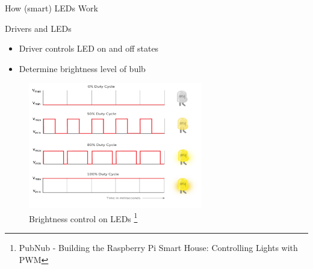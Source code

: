 \documentclass[11pt,t,usepdftitle=false,aspectratio=169]{beamer}
\begin{document}
\begin{frame}{How (smart) LEDs Work}
{        \begin{block}{Drivers and LEDs}
            \begin{itemize}
                \item Driver controls LED on and off states
                \item Determine brightness level of bulb
            \end{itemize}
        \end{block}
    }
     {
        \begin{figure}
            \centering
            \includegraphics[height=5.5cm,keepaspectratio]{img/pwm-duty-cycle.png}
            \caption{\small{Brightness control on LEDs} \footnote{\tiny{PubNub - Building the Raspberry Pi Smart House: Controlling Lights with PWM}}}
        \end{figure}
    }
\end{frame}

\end{document}
